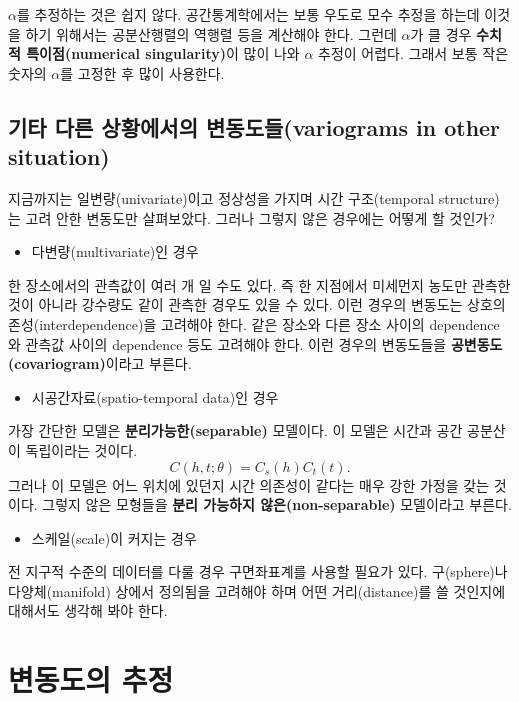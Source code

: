 \documentclass[b5paper,]{scrbook}
\providecommand{\tightlist}{%
  \setlength{\itemsep}{0pt}\setlength{\parskip}{0pt}}
\theoremstyle{plain}
\theoremstyle{definition}
\numberwithin{equation}{section}
\begin{document}
\(\alpha\)를 추정하는 것은 쉽지 않다. 공간통계학에서는 보통 우도로 모수
추정을 하는데 이것을 하기 위해서는 공분산행렬의 역행렬 등을 계산해야
한다. 그런데 \(\alpha\)가 클 경우 \textbf{수치적 특이점(numerical
singularity)}이 많이 나와 \(\alpha\) 추정이 어렵다. 그래서 보통 작은
숫자의 \(\alpha\)를 고정한 후 많이 사용한다.

\section{기타 다른 상황에서의 변동도들(variograms in other
situation)}\label{---variograms-in-other-situation}

지금까지는 일변량(univariate)이고 정상성을 가지며 시간 구조(temporal
structure)는 고려 안한 변동도만 살펴보았다. 그러나 그렇지 않은 경우에는
어떻게 할 것인가?

\begin{itemize}
\tightlist
\item
  다변량(multivariate)인 경우
\end{itemize}

한 장소에서의 관측값이 여러 개 일 수도 있다. 즉 한 지점에서 미세먼지
농도만 관측한 것이 아니라 강수량도 같이 관측한 경우도 있을 수 있다. 이런
경우의 변동도는 상호의존성(interdependence)을 고려해야 한다. 같은 장소와
다른 장소 사이의 dependence와 관측값 사이의 dependence 등도 고려해야
한다. 이런 경우의 변동도들을 \textbf{공변동도(covariogram)}이라고
부른다.

\begin{itemize}
\tightlist
\item
  시공간자료(spatio-temporal data)인 경우
\end{itemize}

가장 간단한 모델은 \textbf{분리가능한(separable)} 모델이다. 이 모델은
시간과 공간 공분산이 독립이라는 것이다.
\[C(h,t;\theta)=C_{s}(h)C_{t}(t).\] 그러나 이 모델은 어느 위치에 있던지
시간 의존성이 같다는 매우 강한 가정을 갖는 것이다. 그렇지 않은 모형들을
\textbf{분리 가능하지 않은(non-separable)} 모델이라고 부른다.

\begin{itemize}
\tightlist
\item
  스케일(scale)이 커지는 경우
\end{itemize}

전 지구적 수준의 데이터를 다룰 경우 구면좌표계를 사용할 필요가 있다.
구(sphere)나 다양체(manifold) 상에서 정의됨을 고려해야 하며 어떤
거리(distance)를 쓸 것인지에 대해서도 생각해 봐야 한다.

\chapter{변동도의 추정}\label{variogramest}
\end{document}
